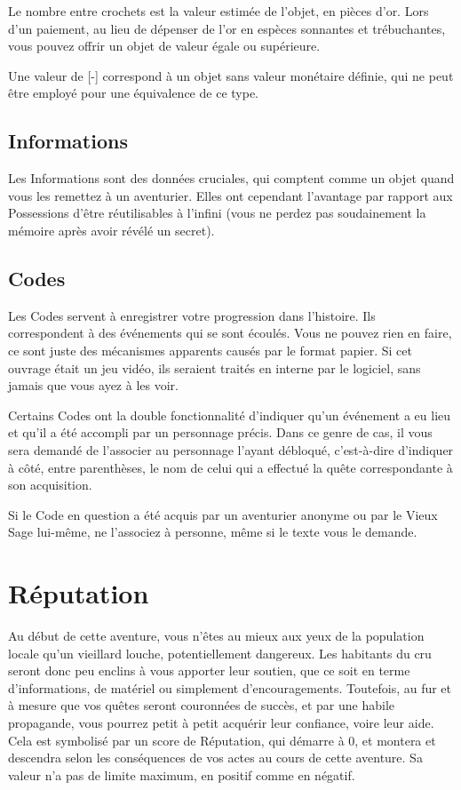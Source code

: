 \documentclass{report}
\begin{document}
Le nombre entre crochets est la valeur estimée de l'objet, en pièces d'or. Lors d'un paiement, au lieu de dépenser de l'or en espèces sonnantes et trébuchantes, vous pouvez offrir un objet de valeur égale ou supérieure.

Une valeur de [-] correspond à un objet sans valeur monétaire définie, qui ne peut être employé pour une équivalence de ce type.

\subsection{Informations}

Les Informations sont des données cruciales, qui comptent comme un objet quand vous les remettez à un aventurier. Elles ont cependant l'avantage par rapport aux Possessions d'être réutilisables à l'infini (vous ne perdez pas soudainement la mémoire après avoir révélé un secret).

\subsection{Codes}

Les Codes servent à enregistrer votre progression dans l'histoire. Ils correspondent à des événements qui se sont écoulés. Vous ne pouvez rien en faire, ce sont juste des mécanismes apparents causés par le format papier. Si cet ouvrage était un jeu vidéo, ils seraient traités en interne par le logiciel, sans jamais que vous ayez à les voir.

Certains Codes ont la double fonctionnalité d'indiquer qu'un événement a eu lieu et qu'il a été accompli par un personnage précis. Dans ce genre de cas, il vous sera demandé de l'associer au personnage l'ayant débloqué, c'est-à-dire d'indiquer à côté, entre parenthèses, le nom de celui qui a effectué la quête correspondante à son acquisition.

Si le Code en question a été acquis par un aventurier anonyme ou par le Vieux Sage lui-même, ne l'associez à personne, même si le texte vous le demande.

\section{Réputation}

Au début de cette aventure, vous n'êtes au mieux aux yeux de la population locale qu'un vieillard louche, potentiellement dangereux. Les habitants du cru seront donc peu enclins à vous apporter leur soutien, que ce soit en terme d'informations, de matériel ou simplement d'encouragements. Toutefois, au fur et à mesure que vos quêtes seront couronnées de succès, et par une habile propagande, vous pourrez petit à petit acquérir leur confiance, voire leur aide.
Cela est symbolisé par un score de Réputation, qui démarre à 0, et montera et descendra selon les conséquences de vos actes au cours de cette aventure. Sa valeur n'a pas de limite maximum, en positif comme en négatif.
\end{document}
